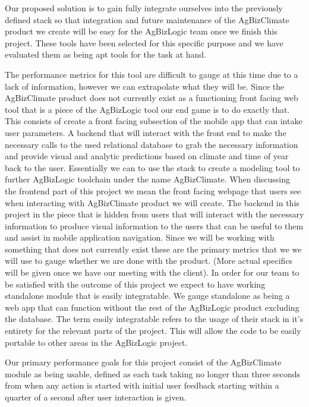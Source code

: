 \documentclass[letterpaper,10pt]{article}
\begin{document}
Our proposed solution is to gain fully integrate ourselves into the previously defined stack so that integration and future maintenance of the AgBizClimate product we create will be easy for the AgBizLogic team once we finish this project. These tools have been selected for this specific purpose and we have evaluated them as being apt tools for the task at hand.

The performance metrics for this tool are difficult to gauge at this time due to a lack of information, however we can extrapolate what they will be. Since the AgBizClimate product does not currently exist as a functioning front facing web tool that is a piece of the AgBizLogic tool our end game is to do exactly that. This consists of create a front facing subsection of the mobile app that can intake user parameters. A backend that will interact with the front end to make the necessary calls to the used relational database to grab the necessary information and provide visual and analytic predictions based on climate and time of year back to the user. Essentially we can to use the stack to create a modeling tool to further AgBizLogic toolchain under the name AgBizClimate. When discussing the frontend part of this project we mean the front facing webpage that users see when interacting with AgBizClimate product we will create. The backend in this project in the piece that is hidden from users that will interact with the necessary information to produce visual information to the users that can be useful to them and assist in mobile application navigation. Since we will be working with something that does not currently exist these are the primary metrics that we we will use to gauge whether we are done with the product. (More actual specifics will be given once we have our meeting with the client). In order for our team to be satisfied with the outcome of this project we expect to have working standalone module that is easily integratable. We gauge standalone as being a web app that can function without the rest of the AgBizLogic product excluding the database. The term easily integratable refers to the usage of their stack in it’s entirety for the relevant parts of the project. This will allow the code to be easily portable to other areas in the AgBizLogic project.

Our primary performance goals for this project consist of the AgBizClimate module as being usable, defined as each task taking no longer than three seconds from when any action is started with initial user feedback starting within a quarter of a second after user interaction is given.
\end{document}
